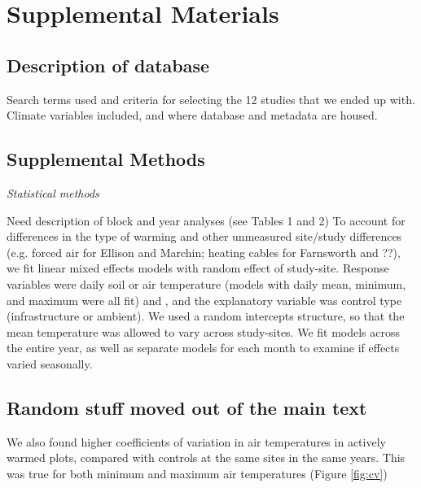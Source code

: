 \documentclass{article}
\begin{document}
\clearpage
\section*{Supplemental Materials}
\subsection*{Description of database}
Search terms used and criteria for selecting the 12 studies that we ended up with. Climate variables included, and where database and metadata are housed.
\subsection*{Supplemental Methods}
\par\textit{Statistical methods}
\par Need description of block and year analyses (see Tables 1 and 2) 
To account for differences in the type of warming and other unmeasured site/study differences (e.g. forced air for Ellison and Marchin; heating cables for Farnsworth and ??), we fit linear mixed effects models with random effect of study-site. Response variables were daily soil or air temperature (models with daily  mean, minimum, and maximum were all fit) and , and the explanatory variable was control type (infrastructure or ambient). We used a random intercepts structure, so that the mean temperature was allowed to vary across study-sites. We fit models across the entire year, as well as separate models for each month to examine if effects varied seasonally.
\subsection*{Random stuff moved out of the main text}
We also found higher coefficients of variation in air temperatures in actively warmed plots, compared with controls at the same sites in the same years. This was true for both minimum and maximum air temperatures (Figure \ref{fig:cv})
\end{document}
